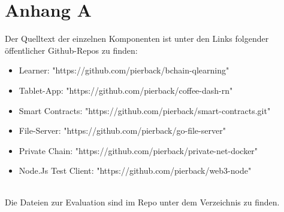 \chapter{Anhang A}
\label{kap:AppendixA}
Der Quelltext der einzelnen Komponenten ist unter den Links folgender öffentlicher Github-Repos zu finden: 
\begin{itemize}
    \item Learner: "https://github.com/pierback/bchain-qlearning"
    \item Tablet-App: "https://github.com/pierback/coffee-dash-rn"
    \item Smart Contracts: "https://github.com/pierback/smart-contracts.git"
    \item File-Server: "https://github.com/pierback/go-file-server"
    \item Private Chain: "https://github.com/pierback/private-net-docker"
    \item Node.Js Test Client: "https://github.com/pierback/web3-node"
\end{itemize}
\ \\
Die Dateien zur Evaluation sind im Repo  unter dem Verzeichnis  zu finden.